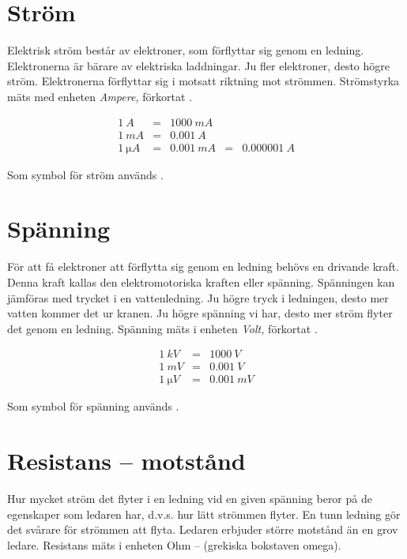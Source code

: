 \section{Ström}

Elektrisk ström består av elektroner, som
förflyttar sig genom en ledning. Elektronerna
är bärare av elektriska laddningar. Ju fler
elektroner, desto högre ström. Elektronerna
förflyttar sig i motsatt riktning mot strömmen.
Strömstyrka mäts med enheten \emph{Ampere,}
förkortat .


\[
\begin{array}{rclcl}
\SI{1}{A}  &=& \SI{1000}{mA} \\
\SI{1}{mA} &=& \SI{0.001}{A} \\
\SI{1}{\micro A} &=& \SI{0.001}{mA} &=& \SI{0.000001}{A}
\end{array}
\]

Som symbol för ström används .

\section{Spänning}

För att få elektroner att förflytta sig gen\-om
en ledning behövs en drivande kraft. Denna
kraft kallas den el\-ek\-tro\-mo\-to\-ris\-ka kraften
eller spänning. Spänningen kan jämföras
med trycket i en vattenledning. Ju högre
tryck i ledningen, desto mer vatten kommer
det ur kranen. Ju högre spänning vi har, desto
mer ström flyter det genom en ledning.
Spänning mäts i enheten \emph{Volt,} förkortat .

\[
\begin{array}{rcl}
\SI{1}{kV} &=& \SI{1000}{V} \\
\SI{1}{mV} &=& \SI{0.001}{V} \\
\SI{1}{\micro V} &=& \SI{0.001}{mV}
\end{array}
\]

Som symbol för spänning används .

\section{Resistans -- motstånd}

Hur mycket ström det flyter i en ledning
vid en given spänning beror på de egenskaper
som ledaren har, d.v.s. hur lätt strömmen
flyter. En tunn ledning gör det svårare för
strömmen att flyta. Ledaren erbjuder större
motstånd än en grov ledare. Resistans mäts i enheten Ohm -- \enhet{\Omega}
(grekiska bokstaven omega).

